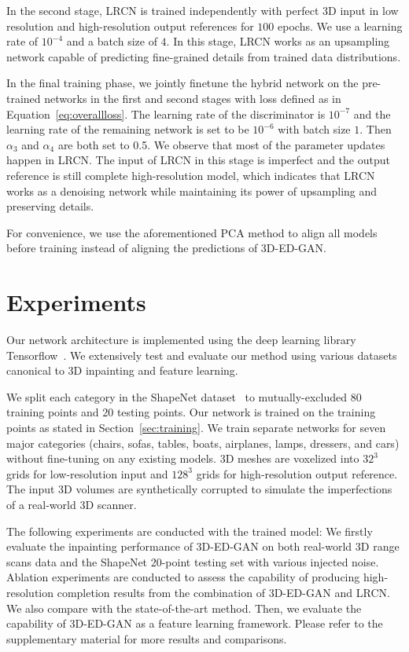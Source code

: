 \documentclass[10pt,twocolumn,letterpaper]{article}
\begin{document}
In the second stage, LRCN is trained independently with perfect 3D input in low resolution and high-resolution output references for $100$ epochs. We use a learning rate of $10^{-4}$ and a batch size of $4$. In this stage, LRCN works as an upsampling network capable of predicting fine-grained details from trained data distributions.

In the final training phase, we jointly finetune the hybrid network on the pre-trained networks in the first and second stages with loss defined as in Equation~\ref{eq:overallloss}. The learning rate of the discriminator is $10^{-7}$ and the learning rate of the remaining network is set to be $10^{-6}$ with batch size $1$. Then $\alpha_3$ and $\alpha_4$ are both set to 0.5. We observe that most of the parameter updates happen in LRCN. The input of LRCN in this stage is imperfect and the output reference is still complete high-resolution model, which indicates that LRCN works as a denoising network while maintaining its power of upsampling and preserving details.

For convenience, we use the aforementioned PCA method to align all models before training instead of aligning the predictions of 3D-ED-GAN.

\section{Experiments}
\label{sec:experiment}

Our network architecture is implemented using the deep learning library Tensorflow~\cite{tensorflow}. We extensively test and evaluate our method using various datasets canonical to 3D inpainting and feature learning.

We split each category in the ShapeNet dataset~\cite{shapenet} to mutually-excluded 80 training points and 20 testing points. Our network is trained on the training points as stated in Section~\ref{sec:training}. We train separate networks for seven major categories (chairs, sofas, tables, boats, airplanes, lamps, dressers, and cars) without fine-tuning on any existing models. 3D meshes are voxelized into $32^3$ grids for low-resolution input and $128^3$ grids for high-resolution output reference. The input 3D volumes are synthetically corrupted to simulate the imperfections of a real-world 3D scanner.

The following experiments are conducted with the trained model: We firstly evaluate the inpainting performance of 3D-ED-GAN on both real-world 3D range scans data and the ShapeNet 20-point testing set with various injected noise. Ablation experiments are conducted to assess the capability of producing high-resolution completion results from the combination of 3D-ED-GAN and LRCN. We also compare with the state-of-the-art method. Then, we evaluate the capability of 3D-ED-GAN as a feature learning framework. Please refer to the supplementary material for more results and comparisons.
\end{document}
